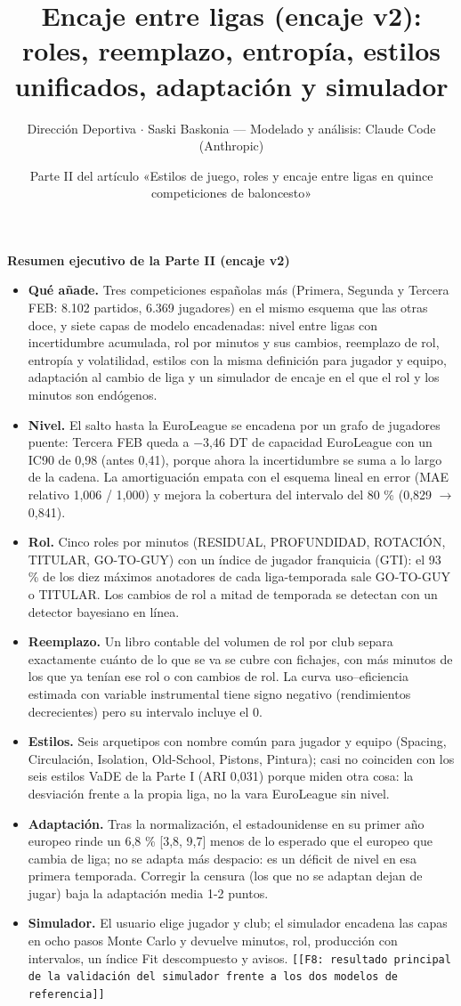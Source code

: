 \documentclass[10pt,a4paper]{article}
\title{Encaje entre ligas (encaje v2): roles, reemplazo, entropía, estilos unificados, adaptación y simulador}
\author{Dirección Deportiva \ensuremath{\cdot} Saski Baskonia --- Modelado y análisis: Claude Code (Anthropic)}
\date{Parte II del artículo «Estilos de juego, roles y encaje entre ligas en quince competiciones de baloncesto»}
\newcommand{\fochopendiente}[1]{\textcolor{red!60!black}{\texttt{[[F8: #1]]}}}
\newenvironment{resumenbox}[1]{\par\medskip\noindent\textbf{#1}\par}{\par\medskip}
\begin{document}
\maketitle
\begin{resumenbox}{Resumen ejecutivo de la Parte II (encaje v2)}
\begin{itemize}
  \item \textbf{Qué añade.} Tres competiciones españolas más (Primera, Segunda y Tercera FEB: 8.102 partidos, 6.369 jugadores) en el mismo esquema que las otras doce, y siete capas de modelo encadenadas: nivel entre ligas con incertidumbre acumulada, rol por minutos y sus cambios, reemplazo de rol, entropía y volatilidad, estilos con la misma definición para jugador y equipo, adaptación al cambio de liga y un simulador de encaje en el que el rol y los minutos son endógenos.
  \item \textbf{Nivel.} El salto hasta la EuroLeague se encadena por un grafo de jugadores puente: Tercera FEB queda a \ensuremath{-}3,46 DT de capacidad EuroLeague con un IC90 de 0,98 (antes 0,41), porque ahora la incertidumbre se suma a lo largo de la cadena. La amortiguación empata con el esquema lineal en error (MAE relativo 1,006 / 1,000) y mejora la cobertura del intervalo del 80 \% (0,829 \ensuremath{\to} 0,841).
  \item \textbf{Rol.} Cinco roles por minutos (RESIDUAL, PROFUNDIDAD, ROTACIÓN, TITULAR, GO-TO-GUY) con un índice de jugador franquicia (GTI): el 93 \% de los diez máximos anotadores de cada liga-temporada sale GO-TO-GUY o TITULAR. Los cambios de rol a mitad de temporada se detectan con un detector bayesiano en línea.
  \item \textbf{Reemplazo.} Un libro contable del volumen de rol por club separa exactamente cuánto de lo que se va se cubre con fichajes, con más minutos de los que ya tenían ese rol o con cambios de rol. La curva uso--eficiencia estimada con variable instrumental tiene signo negativo (rendimientos decrecientes) pero su intervalo incluye el 0.
  \item \textbf{Estilos.} Seis arquetipos con nombre común para jugador y equipo (Spacing, Circulación, Isolation, Old-School, Pistons, Pintura); casi no coinciden con los seis estilos VaDE de la Parte I (ARI 0,031) porque miden otra cosa: la desviación frente a la propia liga, no la vara EuroLeague sin nivel.
  \item \textbf{Adaptación.} Tras la normalización, el estadounidense en su primer año europeo rinde un 6,8 \% [3,8, 9,7] menos de lo esperado que el europeo que cambia de liga; no se adapta más despacio: es un déficit de nivel en esa primera temporada. Corregir la censura (los que no se adaptan dejan de jugar) baja la adaptación media 1-2 puntos.
  \item \textbf{Simulador.} El usuario elige jugador y club; el simulador encadena las capas en ocho pasos Monte Carlo y devuelve minutos, rol, producción con intervalos, un índice Fit descompuesto y avisos. \fochopendiente{resultado principal de la validación del simulador frente a los dos modelos de referencia}
\end{itemize}
\end{resumenbox}
\tableofcontents
\end{document}
